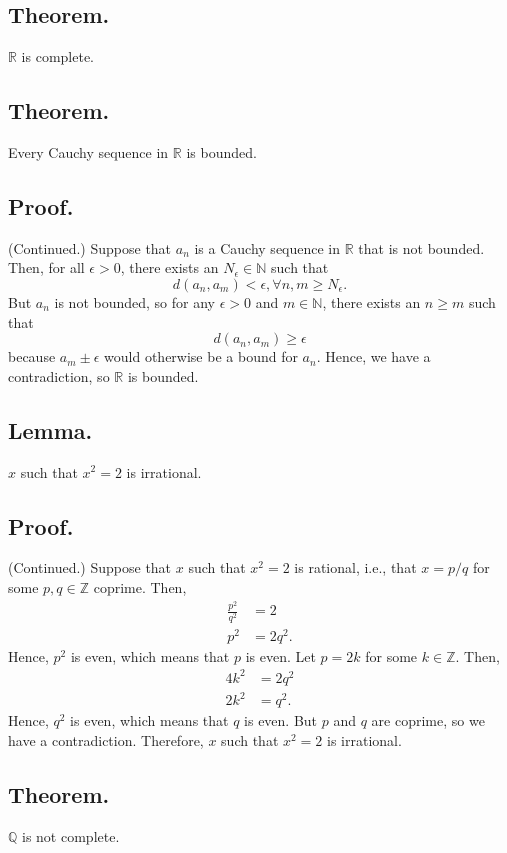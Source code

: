 \documentclass[titlepage]{article}
\begin{document}
\subsection{Theorem.} $\mathbb{R}$ is complete.

\subsection{Theorem.} Every Cauchy sequence in $\mathbb{R}$ is bounded.

\subsection{Proof.} (Continued.) Suppose that $a_{n}$ is a Cauchy sequence in $\mathbb{R}$ that is not bounded. Then, for all $\epsilon > 0$, there exists an $N_{\epsilon} \in \mathbb{N}$ such that
$$d(a_{n}, a_{m}) < \epsilon, \forall n,m \geq N_{\epsilon}.$$
But $a_{n}$ is not bounded, so for any $\epsilon > 0$ and $m \in \mathbb{N}$, there exists an $n \geq m$ such that 
$$d(a_{n}, a_{m}) \geq \epsilon$$
because $a_{m} \pm \epsilon$ would otherwise be a bound for $a_{n}$. Hence, we have a contradiction, so $\mathbb{R}$ is bounded.

\subsection{Lemma.} $x$ such that $x^{2} = 2$ is irrational.

\subsection{Proof.} (Continued.) Suppose that $x$ such that $x^{2} = 2$ is rational, i.e., that $x = p/q$ for some $p,q \in \mathbb{Z}$ coprime. Then, 
\begin{align*}
    \frac{p^{2}}{q^{2}} &= 2 \\
                  p^{2} &= 2q^{2}.
\end{align*}
Hence, $p^{2}$ is even, which means that $p$ is even. Let $p = 2k$ for some $k \in \mathbb{Z}$. Then, 
\begin{align*}
    4k^{2} &= 2q^{2} \\
    2k^{2} &= q^{2}.
\end{align*}
Hence, $q^{2}$ is even, which means that $q$ is even. But $p$ and $q$ are coprime, so we have a contradiction. Therefore, $x$ such that $x^{2} = 2$ is irrational.

\subsection{Theorem.} $\mathbb{Q}$ is not complete.
\end{document}
